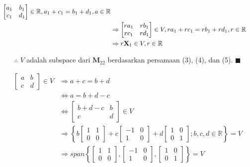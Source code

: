 \documentclass[12pt, a4paper]{scrartcl}
\begin{document}
\begin{enumerate}
\begin{enumerate}
\begin{align}
\begin{bmatrix}
                    a_1&b_1\\c_1&d_1
                \end{bmatrix} \in \mathbb{R}, a_1 + c_1 = b_1 + d_1, a \in \mathbb{R} \notag
                \\ &\Rightarrow \begin{bmatrix}
                    ra_1&rb_1\\rc_1&rd_1
                \end{bmatrix} \in V, ra_1 + rc_1 = rb_1 + rd_1, r \in \mathbb{R} \notag
                \\ &\Rightarrow r\textbf{X}_1 \in V, r \in \mathbb{R}
            \end{align}

            \begin{itemize}
                \item[$\therefore$] $V$ adalah subspace dari $\textbf{M}_{22}$ berdasarkan persamaan (3), (4), dan (5). $\blacksquare$
            \end{itemize}

            \begin{align*}
                \begin{bmatrix}
                    a&b\\c&d
                \end{bmatrix} \in V &\Rightarrow a+c = b+d 
                \\ &\Leftrightarrow a = b+d-c
                \\ &\Leftrightarrow \begin{bmatrix}
                    b+d-c&b\\c&d
                \end{bmatrix} \in V
                \\ &\Rightarrow \left\{ b\begin{bmatrix}
                    1&1\\0&0
                \end{bmatrix}+c\begin{bmatrix}
                    -1&0\\1&0
                \end{bmatrix}+d\begin{bmatrix}
                    1&0\\0&1
                \end{bmatrix}; b, c, d \in \mathbb{R} \right\} = V
                \\ &\Rightarrow span \left\{\begin{bmatrix}
                    1&1\\0&0
                \end{bmatrix}, \begin{bmatrix}
                    -1&0\\1&0
                \end{bmatrix}, \begin{bmatrix}
                    1&0\\0&1
                \end{bmatrix} \right\} = V
            \end{align*}


\end{enumerate}
\end{enumerate}
\end{document}
